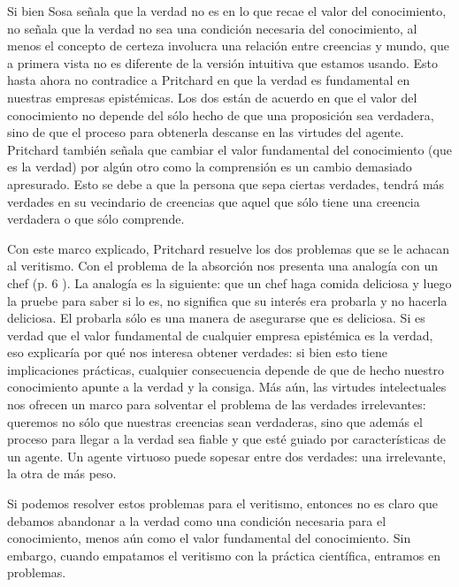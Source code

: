 \documentclass{article}
\begin{document}
Si bien Sosa señala que la verdad no es en lo que recae el valor del conocimiento, no señala que la verdad no sea una condición necesaria del conocimiento, al menos el concepto de certeza involucra una relación entre creencias y mundo, que a primera vista no es diferente de la versión intuitiva que estamos usando. Esto hasta ahora no contradice a Pritchard en que la verdad es fundamental en nuestras empresas epistémicas. Los dos están de acuerdo en que el valor del conocimiento no depende del sólo hecho de que una proposición sea verdadera, sino de que el proceso para obtenerla descanse en las virtudes del agente. Pritchard también señala que cambiar el valor fundamental del conocimiento (que es la verdad) por algún otro como la comprensión es un cambio demasiado apresurado. Esto se debe a que la persona que sepa ciertas verdades, tendrá más verdades en su vecindario de creencias que aquel que sólo tiene una creencia verdadera o que sólo comprende.

Con este marco explicado, Pritchard resuelve los dos problemas que se le achacan al veritismo. Con el problema de la absorción nos presenta una analogía con un chef (p. 6 ). La analogía es la siguiente: que un chef haga comida deliciosa y luego la pruebe para saber si lo es, no significa que su interés era probarla y no hacerla deliciosa. El probarla sólo es una manera de asegurarse que es deliciosa. Si es verdad que el valor fundamental de cualquier empresa epistémica es la verdad, eso explicaría por qué nos interesa obtener verdades: si bien esto tiene implicaciones prácticas, cualquier consecuencia depende de que de hecho nuestro conocimiento apunte a la verdad y la consiga. Más aún, las virtudes intelectuales nos ofrecen un marco para solventar el problema de las verdades irrelevantes: queremos no sólo que nuestras creencias sean verdaderas, sino que además el proceso para llegar a la verdad sea fiable y que esté guiado por características de un agente. Un agente virtuoso puede sopesar entre dos verdades: una irrelevante, la otra de más peso.

Si podemos resolver estos problemas para el veritismo, entonces no es claro que debamos abandonar a la verdad como una condición necesaria para el conocimiento, menos aún como el valor fundamental del conocimiento. Sin embargo, cuando empatamos el veritismo con la práctica científica, entramos en problemas.
\end{document}
